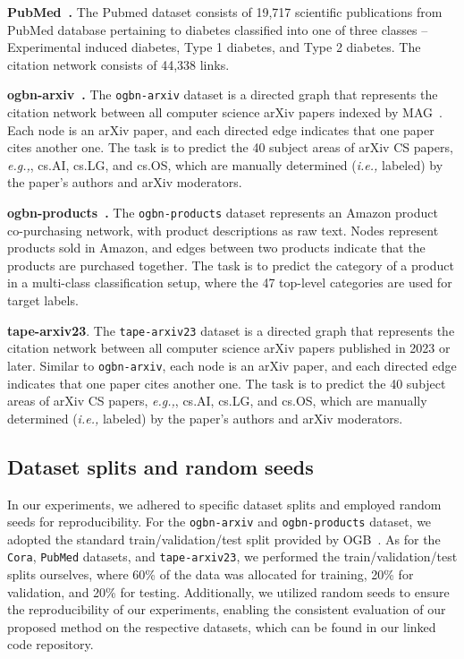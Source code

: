 \documentclass{article}
\newcommand{\ie}{\emph{i.e.,}\xspace}
\newcommand{\eg}{\emph{e.g.,}\xspace}
\begin{document}
\textbf{PubMed~\citep{sen2008collective_pubmed}.}
The Pubmed dataset consists of 19,717 scientific publications from PubMed database pertaining to diabetes classified into one of three classes -- Experimental induced diabetes, Type 1 diabetes, 
 and Type 2 diabetes. The citation network consists of 44,338 links. 

\textbf{ogbn-arxiv~\citep{hu2020open}.}
The \texttt{ogbn-arxiv} dataset is a directed graph that represents the citation network between all computer science arXiv papers indexed by MAG~\citep{wang2020microsoft_mag}. Each node is an arXiv paper, and each directed edge indicates that one paper cites another one. The task is to predict the 40 subject areas of arXiv CS papers, \eg, cs.AI, cs.LG, and cs.OS, which are manually determined (\ie labeled) by the paper’s authors and arXiv moderators. 

\textbf{ogbn-products~\citep{hu2020open}.}
The \texttt{ogbn-products} dataset represents an Amazon product co-purchasing network, with product descriptions as raw text. Nodes represent products sold in Amazon, and edges between two products indicate that the products are purchased together. The task is to predict the category of a product in a multi-class classification setup, where the 47 top-level categories are used for target labels.

\textbf{tape-arxiv23}. 
The \texttt{tape-arxiv23} dataset is a directed graph that represents the citation network between all computer science arXiv papers published in 2023 or later. Similar to \texttt{ogbn-arxiv}, each node is an arXiv paper, and each directed edge indicates that one paper cites another one. The task is to predict the 40 subject areas of arXiv CS papers, \eg, cs.AI, cs.LG, and cs.OS, which are manually determined (\ie labeled) by the paper’s authors and arXiv moderators. 




\subsection{Dataset splits and random seeds}
In our experiments, we adhered to specific dataset splits and employed random seeds for reproducibility.
For the \texttt{ogbn-arxiv} and \texttt{ogbn-products} dataset, we adopted the standard train/validation/test split provided by OGB~\citep{hu2020open}.
As for the \texttt{Cora}, \texttt{PubMed} datasets, and \texttt{tape-arxiv23}, we performed the train/validation/test splits ourselves, where 60\% of the data was allocated for training, 20\% for validation, and 20\% for testing. Additionally, we utilized random seeds to ensure the reproducibility of our experiments, enabling the consistent evaluation of our proposed method on the respective datasets, which can be found in our linked code repository.
\end{document}
